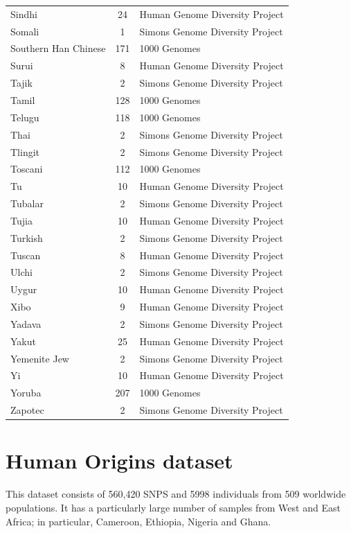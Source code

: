 \begin{longtable}[t]{lcl}
Sindhi & 24 & Human Genome Diversity Project\\
Somali & 1 & Simons Genome Diversity Project\\
Southern Han Chinese & 171 & 1000 Genomes\\
Surui & 8 & Human Genome Diversity Project\\
Tajik & 2 & Simons Genome Diversity Project\\
Tamil & 128 & 1000 Genomes\\
Telugu & 118 & 1000 Genomes\\
Thai & 2 & Simons Genome Diversity Project\\
Tlingit & 2 & Simons Genome Diversity Project\\
Toscani & 112 & 1000 Genomes\\
Tu & 10 & Human Genome Diversity Project\\
Tubalar & 2 & Simons Genome Diversity Project\\
Tujia & 10 & Human Genome Diversity Project\\
Turkish & 2 & Simons Genome Diversity Project\\
Tuscan & 8 & Human Genome Diversity Project\\
Ulchi & 2 & Simons Genome Diversity Project\\
Uygur & 10 & Human Genome Diversity Project\\
Xibo & 9 & Human Genome Diversity Project\\
Yadava & 2 & Simons Genome Diversity Project\\
Yakut & 25 & Human Genome Diversity Project\\
Yemenite Jew & 2 & Simons Genome Diversity Project\\
Yi & 10 & Human Genome Diversity Project\\
Yoruba & 207 & 1000 Genomes\\
Zapotec & 2 & Simons Genome Diversity Project\\*
\end{longtable}
\endgroup{}


\section{Human Origins dataset} \label{HumanOriginsAppendix}

This dataset consists of 560,420 SNPS and 5998 individuals from 509 worldwide populations. It has a particularly large number of samples from West and East Africa; in particular, Cameroon, Ethiopia, Nigeria and Ghana. 

